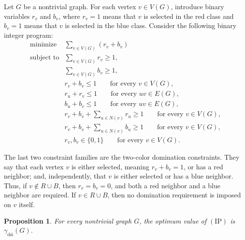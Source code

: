 \documentclass[11pt]{article}
\newtheorem{proposition}[theorem]{Proposition}
\theoremstyle{definition}
\theoremstyle{remark}
\newcommand{\dsi}{\mathrm{dsi}}
\begin{document}
Let \(G\) be a nontrivial graph. For each vertex \(v\in V(G)\), introduce
binary variables \(r_v\) and \(b_v\), where \(r_v=1\) means that \(v\) is
selected in the red class and \(b_v=1\) means that \(v\) is selected in the
blue class. Consider the following binary integer program:
\[
\begin{array}{ll}
\text{minimize} &
   \displaystyle \sum_{v\in V(G)}(r_v+b_v) \\[1.2em]
\text{subject to} &
   \displaystyle \sum_{v\in V(G)} r_v \ge 1, \\[0.8em]
&
   \displaystyle \sum_{v\in V(G)} b_v \ge 1, \\[0.8em]
&
   r_v+b_v\le 1
      \qquad\text{for every } v\in V(G), \\[0.8em]
&
   r_u+r_v\le 1
      \qquad\text{for every } uv\in E(G), \\[0.8em]
&
   b_u+b_v\le 1
      \qquad\text{for every } uv\in E(G), \\[0.8em]
&
   \displaystyle r_v+b_v+\sum_{u\in N(v)} r_u\ge 1
      \qquad\text{for every } v\in V(G), \\[1.2em]
&
   \displaystyle r_v+b_v+\sum_{u\in N(v)} b_u\ge 1
      \qquad\text{for every } v\in V(G), \\[1.2em]
&
   r_v,b_v\in\{0,1\}
      \qquad\text{for every } v\in V(G).
\end{array}
\tag{IP}
\]

The last two constraint families are the two-color domination constraints.
They say that each vertex \(v\) is either selected, meaning \(r_v+b_v=1\),
or has a red neighbor; and, independently, that \(v\) is either selected or
has a blue neighbor. Thus, if \(v\notin R\cup B\), then \(r_v=b_v=0\), and
both a red neighbor and a blue neighbor are required. If \(v\in R\cup B\),
then no domination requirement is imposed on \(v\) itself.


\begin{proposition}
\label{prop:ip-formulation}
For every nontrivial graph \(G\), the optimum value of \((\mathrm{IP})\) is
\(\gamma_{\dsi}(G)\).
\end{proposition}
\end{document}
